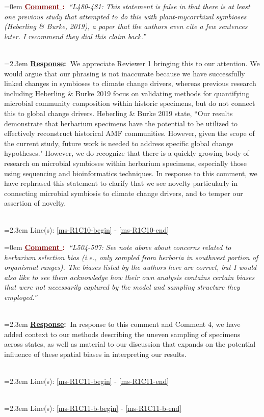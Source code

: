 \documentclass[12pt]{article}
\newcounter{cN}
\newcommand{\comment}[1]{
	\vspace{2em}
	\refstepcounter{cN} %
	\noindent \hangindent=0em \textbf{\textcolor{Maroon}{\uline{Comment \thecN}:~}}\emph{``#1''}
	}
\newcommand{\response}[1]{
	\\[0.25em]
	\hangindent=2.3em \textbf{\textcolor{NavyBlue}{\uline{Response}:~}}#1
	}
\newcommand{\linesref}[2]{
		\\[0.25em]
	\hangindent=2.3em {\color{Mahogany} Line(s): \ref{#1} - \ref{#2}}
}
\begin{document}
\comment{L480-481: This statement is false in that there is at least one previous study that attempted to do this with plant-mycorrhizal symbioses (Heberling \& Burke, 2019), a paper that the authors even cite a few sentences later. I recommend they dial this claim back.}
\response{We appreciate Reviewer 1 bringing this to our attention. We would argue that our phrasing is not inaccurate because we have successfully linked changes in symbioses to climate change drivers, whereas previous research including Heberling \& Burke 2019 focus on validating methods for quantifying microbial community composition within historic specimens, but do not connect this to global change drivers. Heberling \& Burke 2019 state, ``Our results demonstrate that herbarium specimens have the potential to be utilized to effectively reconstruct historical AMF communities. However, given the scope of the current study, future work is needed to address specific global change hypotheses." However, we do recognize that there is a quickly growing body of research on microbial symbioses within herbarium specimens, especially those using sequencing and bioinformatics techniques. In response to this comment, we have rephrased this statement to clarify that we see novelty particularly in connecting microbial symbiosis to climate change drivers, and to temper our assertion of novelty.}
\linesref{ms-R1C10-begin}{ms-R1C10-end}


\comment{L504-507: See note above about concerns related to herbarium selection bias (i.e., only sampled from herbaria in southwest portion of organismal ranges). The biases listed by the authors here are correct, but I would also like to see them acknowledge how their own analysis contains certain biases that were not necessarily captured by the model and sampling structure they employed.}
\response{In response to this comment and Comment 4, we have added context to our methods describing the uneven sampling of specimens across states, as well as material to our discussion that expands on the potential influence of these spatial biases in interpreting our results.}
\linesref{ms-R1C11-begin}{ms-R1C11-end}
\linesref{ms-R1C11-b-begin}{ms-R1C11-b-end}
\end{document}
